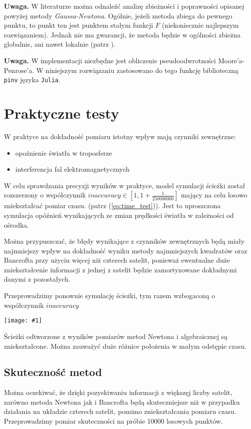 \documentclass{article}
\newcommand{\plot}[1] {
	\texttt{[image: \#1]}
}
\begin{document}
\textbf{Uwaga.} \enspace W literaturze można odnaleźć analizę zbieżności i poprawności opisanej powyżej
metody \textit{Gaussa-Newtona}. Ogólnie, jeżeli metoda zbiega do pewnego punktu, to punkt ten jest punktem stałym
funkcji $F$ (niekoniecznie najlepszym rozwiązaniem). Jednak nie ma gwarancji, że metoda będzie w ogólności zbieżna
globalnie, ani nawet lokalnie (patrz \cite{gauss_newton_convergence}).

\textbf{Uwaga.} \enspace W implementacji niezbędne jest obliczenie pseudoodwrotności Moore'a-Penrose'a.
W niniejszym rozwiązaniu zastosowano do tego funkcję biblioteczną \texttt{pinv} języka \texttt{Julia}.

\section{Praktyczne testy}
\par W praktyce na dokładność pomiaru istotny wpływ mają czynniki zewnętrzne:
	\begin{itemize}
		\item opoźnienie światła w troposferze
		\item interferencja fal elektromagnetycznych
	\end{itemize}
\par W celu sprawdzania precyzji wyników w praktyce, model symulacji ścieżki został rozszerzony o współczynnik $ inaccuracy \in [1, 1 + \frac{1}{250000000} ] $ mający na celu losowo zniekształcać pomiar czasu. (patrz (\ref{eq:time_test})). Jest to uproszczona symulacja opóźnień wynikających ze zmian prędkości światła w zależności od ośrodka.

\par Można przypuszczać, że błędy wynikające z czynników zewnętrznych będą miały najmniejszy wpływ na dokładność wyniku metody najmniejszych kwadratów oraz Bancrofta przy użyciu więcej niż czterech satelit, ponieważ ewentualne duże zniekształcenie informacji z jednej z satelit będzie zamortyzowane dokładnymi danymi z pozostałych.

\par Przeprowadzimy ponownie symulację ścieżki, tym razem wzbogaconą o współczynnik $inaccuracy$

\plot{sciezkipraktyczneall.png}

Ścieżki odtworzone z wyników pomiarów metod Newtona i algebraicznej są zniekształcone. Można zauważyć duże różnice położenia w małym odstępie czasu.

\subsection{Skuteczność metod}
Można oczekiwać, że dzięki pozyskiwaniu informacji z większęj liczby satelit, zarówno metoda Newtona jak i Bancrofta będą skuteczniejsze niż w przypadku działania na układzie czterech satelit, pomimo zniekształcania pomiaru czasu. Przeprowadzimy pomiar skuteczności na próbie 10000 losowych punktów.
\end{document}
